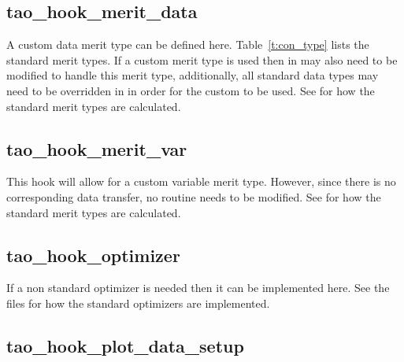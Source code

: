 \subsection{tao\_hook\_merit\_data}

A custom data merit type can be defined here. Table~\ref{t:con_type} lists the
standard merit types. If a custom merit type is used then  in
 may also need to be modified to handle this merit
type, additionally, all standard data types may need to be overridden in 
 in order for the custom  to be used.
See  for how the standard merit types are calculated.

\subsection{tao\_hook\_merit\_var}

This hook will allow for a custom variable merit type. However, since
there is no corresponding data transfer, no  routine needs to be modified.
See  for how the standard merit types are calculated.

\subsection{tao\_hook\_optimizer}

If a non standard optimizer is needed then it can be implemented here. See the
 files for how the standard optimizers are
implemented.

\subsection{tao\_hook\_plot\_data\_setup}

